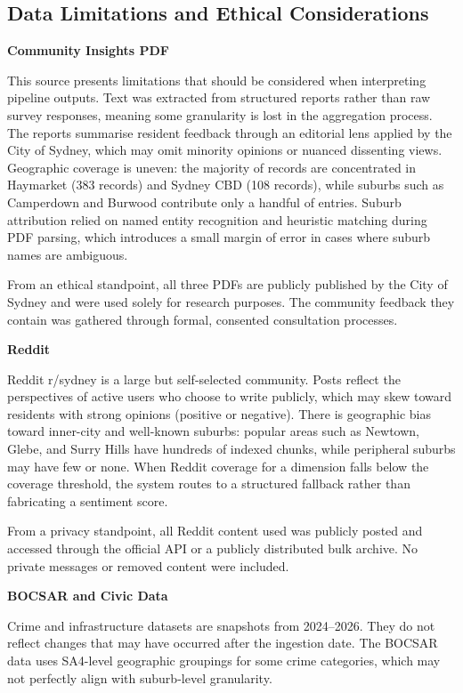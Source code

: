 \documentclass[11pt,a4paper]{article}
\newcounter{none}
\begin{document}
\subsection{Data Limitations and Ethical Considerations}\label{42-data-limitations-and-ethical-considerations}

\textbf{Community Insights PDF}

This source presents limitations that should be considered when interpreting pipeline outputs. Text was extracted from structured reports rather than raw survey responses, meaning some granularity is lost in the aggregation process. The reports summarise resident feedback through an editorial lens applied by the City of Sydney, which may omit minority opinions or nuanced dissenting views. Geographic coverage is uneven: the majority of records are concentrated in Haymarket (383 records) and Sydney CBD (108 records), while suburbs such as Camperdown and Burwood contribute only a handful of entries. Suburb attribution relied on named entity recognition and heuristic matching during PDF parsing, which introduces a small margin of error in cases where suburb names are ambiguous.

From an ethical standpoint, all three PDFs are publicly published by the City of Sydney and were used solely for research purposes. The community feedback they contain was gathered through formal, consented consultation processes.

\textbf{Reddit}

Reddit r/sydney is a large but self-selected community. Posts reflect the perspectives of active users who choose to write publicly, which may skew toward residents with strong opinions (positive or negative). There is geographic bias toward inner-city and well-known suburbs: popular areas such as Newtown, Glebe, and Surry Hills have hundreds of indexed chunks, while peripheral suburbs may have few or none. When Reddit coverage for a dimension falls below the coverage threshold, the system routes to a structured fallback rather than fabricating a sentiment score.

From a privacy standpoint, all Reddit content used was publicly posted and accessed through the official API or a publicly distributed bulk archive. No private messages or removed content were included.

\textbf{BOCSAR and Civic Data}

Crime and infrastructure datasets are snapshots from 2024--2026. They do not reflect changes that may have occurred after the ingestion date. The BOCSAR data uses SA4-level geographic groupings for some crime categories, which may not perfectly align with suburb-level granularity.
\end{document}
